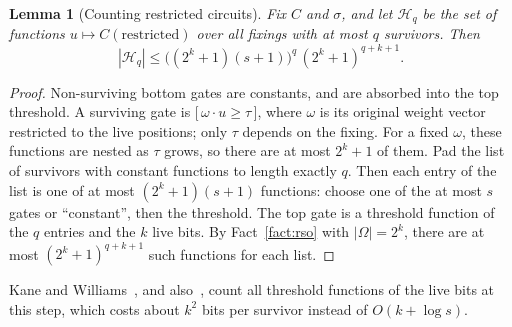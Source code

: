 \documentclass[11pt,letterpaper]{article}
\newtheorem{lemma}[theorem]{Lemma}
\theoremstyle{remark}
\newcommand{\ind}[1]{\bigl[\,#1\,\bigr]}
\newcommand{\cH}{\mathcal H}
\begin{document}
\begin{lemma}[Counting restricted circuits]\label{lem:count}
Fix $C$ and $\sigma$, and let $\cH_q$ be the set of functions
$u\mapsto C(\text{restricted})$ over all fixings with at most $q$
survivors. Then
\[
|\cH_q|\le\bigl((2^k+1)(s+1)\bigr)^q\,(2^k+1)^{q+k+1}.
\]
\end{lemma}
\begin{proof}
Non-surviving bottom gates are constants, and are absorbed into the top
threshold. A surviving gate is $\ind{\omega\cdot u\ge\tau}$, where $\omega$ is
its original weight vector restricted to the live positions; only $\tau$
depends on the fixing. For a fixed $\omega$, these functions are nested as
$\tau$ grows, so there are at most $2^k+1$ of them. Pad the list of survivors
with constant functions to length exactly $q$. Then each entry of the list is
one of at most $(2^k+1)(s+1)$ functions: choose one of the at most $s$ gates
or ``constant'', then the threshold. The top gate is a threshold function of
the $q$ entries and the $k$ live bits. By Fact~\ref{fact:rso} with
$|\Omega|=2^k$, there are at most $(2^k+1)^{q+k+1}$ such functions for each
list.
\end{proof}
Kane and Williams~\cite{KW}, and also~\cite{KKL,CSS}, count all threshold
functions of the live bits at this step, which costs about $k^2$ bits per
survivor instead of $O(k+\log s)$.
\end{document}
